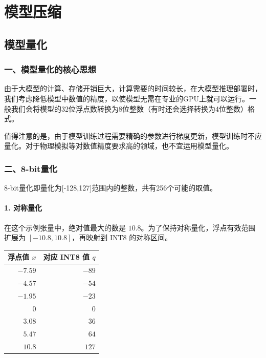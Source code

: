 \hypertarget{ux6a21ux578bux538bux7f29}{%
\chapter{模型压缩}\label{ux6a21ux578bux538bux7f29}}

\hypertarget{ux6a21ux578bux91cfux5316}{%
\section{模型量化}\label{ux6a21ux578bux91cfux5316}}

\hypertarget{ux4e00ux6a21ux578bux91cfux5316ux7684ux6838ux5fc3ux601dux60f3}{%
\subsection{一、模型量化的核心思想}\label{ux4e00ux6a21ux578bux91cfux5316ux7684ux6838ux5fc3ux601dux60f3}}

由于大模型的计算、存储开销巨大，计算需要的时间较长，在大模型推理部署时，我们考虑降低模型中数值的精度，以使模型无需在专业的GPU上就可以运行。一般我们会将模型的32位浮点数转换为8位整数（有时还会选择转换为4位整数）格式。

值得注意的是，由于模型训练过程需要精确的参数进行梯度更新，模型训练时不应量化。对于物理模拟等对数值精度要求高的领域，也不宜运用模型量化。

\hypertarget{ux4e8c8-bitux91cfux5316}{%
\subsection{二、8-bit量化}\label{ux4e8c8-bitux91cfux5316}}

8-bit量化即量化为{[}-128,127{]}范围内的整数，共有256个可能的取值。

\hypertarget{ux5bf9ux79f0ux91cfux5316}{%
\subsubsection{1. 对称量化}\label{ux5bf9ux79f0ux91cfux5316}}

在这个示例张量中，绝对值最大的数是 \(10.8\)。为了保持对称量化，浮点有效范围扩展为 \([-10.8, 10.8]\)，再映射到 INT8 的对称区间。

\begin{longtable}[]{@{}rr@{}}
\toprule
浮点值 \(x\) & 对应 INT8 值 \(q\) \\
\midrule
\endhead
\(-7.59\) & \(-89\) \\
\(-4.57\) & \(-54\) \\
\(-1.95\) & \(-23\) \\
\(0\) & \(0\) \\
\(3.08\) & \(36\) \\
\(5.47\) & \(64\) \\
\(10.8\) & \(127\) \\
\bottomrule
\end{longtable}

